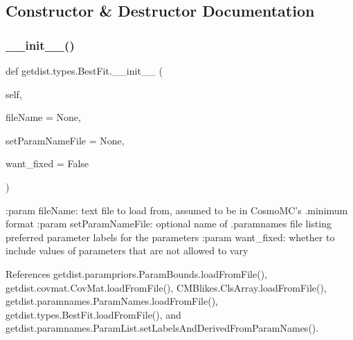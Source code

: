 \subsection{Constructor \& Destructor Documentation}
\mbox{\label{classgetdist_1_1types_1_1BestFit_aa7ed592ec07bd8fe4d9a6de635a6364c}} 
\subsubsection{\texorpdfstring{\+\_\+\+\_\+init\+\_\+\+\_\+()}{\_\_init\_\_()}}
{\footnotesize\ttfamily def getdist.\+types.\+Best\+Fit.\+\_\+\+\_\+init\+\_\+\+\_\+ (\begin{DoxyParamCaption}\item[{}]{self,  }\item[{}]{file\+Name = {\ttfamily None},  }\item[{}]{set\+Param\+Name\+File = {\ttfamily None},  }\item[{}]{want\+\_\+fixed = {\ttfamily False} }\end{DoxyParamCaption})}

\begin{DoxyVerb}:param fileName: text file to load from, assumed to be in CosmoMC's .minimum format
:param setParamNameFile: optional name of .paramnames file listing preferred parameter labels for the parameters
:param want_fixed:  whether to include values of parameters that are not allowed to vary
\end{DoxyVerb}
 

References getdist.\+parampriors.\+Param\+Bounds.\+load\+From\+File(), getdist.\+covmat.\+Cov\+Mat.\+load\+From\+File(), C\+M\+Blikes.\+Cls\+Array.\+load\+From\+File(), getdist.\+paramnames.\+Param\+Names.\+load\+From\+File(), getdist.\+types.\+Best\+Fit.\+load\+From\+File(), and getdist.\+paramnames.\+Param\+List.\+set\+Labels\+And\+Derived\+From\+Param\+Names().

